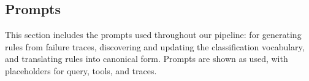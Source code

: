 \subsection{Prompts}
\label{app:prompts}

This section includes the prompts used throughout our pipeline: for generating rules from failure traces, discovering and updating the classification vocabulary, and translating rules into canonical form. Prompts are shown as used, with placeholders for query, tools, and traces.


\lstset{inputencoding=utf8}




